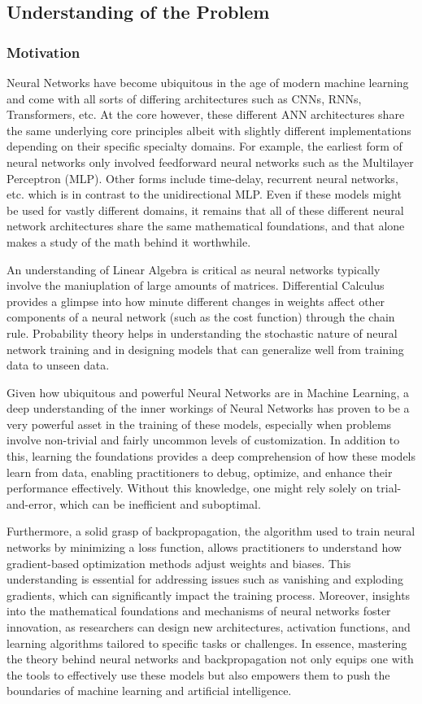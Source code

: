 \documentclass{article} %
\theoremstyle{definition}
\theoremstyle{remark}
\theoremstyle{plain}
\begin{document}
\subsection{Understanding of the Problem}

\subsubsection{Motivation}
Neural Networks have become ubiquitous in the age of modern machine learning and come with all sorts of differing architectures such as CNNs, RNNs, Transformers, etc. At the core however, these different ANN architectures share the same underlying core principles albeit with slightly different implementations depending on their specific specialty domains. For example, the earliest form of neural networks only involved feedforward neural networks such as the Multilayer Perceptron (MLP). Other forms include time-delay, recurrent neural networks, etc. which is in contrast to the unidirectional MLP. Even if these models might be used for vastly different domains, it remains that all of these different neural network architectures share the same mathematical foundations, and that alone makes a study of the math behind it worthwhile.

An understanding of Linear Algebra is critical as neural networks typically involve the maniuplation of large amounts of matrices. Differential Calculus provides a glimpse into how minute different changes in weights affect other components of a neural network (such as the cost function) through the chain rule. Probability theory helps in understanding the stochastic nature of neural network training and in designing models that can generalize well from training data to unseen data.

Given how ubiquitous and powerful Neural Networks are in Machine Learning, a deep understanding of the inner workings of Neural Networks has proven to be a very powerful asset in the training of these models, especially when problems involve non-trivial and fairly uncommon levels of customization. In addition to this, learning the foundations provides a deep comprehension of how these models learn from data, enabling practitioners to debug, optimize, and enhance their performance effectively. Without this knowledge, one might rely solely on trial-and-error, which can be inefficient and suboptimal.

Furthermore, a solid grasp of backpropagation, the algorithm used to train neural networks by minimizing a loss function, allows practitioners to understand how gradient-based optimization methods adjust weights and biases. This understanding is essential for addressing issues such as vanishing and exploding gradients, which can significantly impact the training process. Moreover, insights into the mathematical foundations and mechanisms of neural networks foster innovation, as researchers can design new architectures, activation functions, and learning algorithms tailored to specific tasks or challenges. In essence, mastering the theory behind neural networks and backpropagation not only equips one with the tools to effectively use these models but also empowers them to push the boundaries of machine learning and artificial intelligence.
\end{document}
